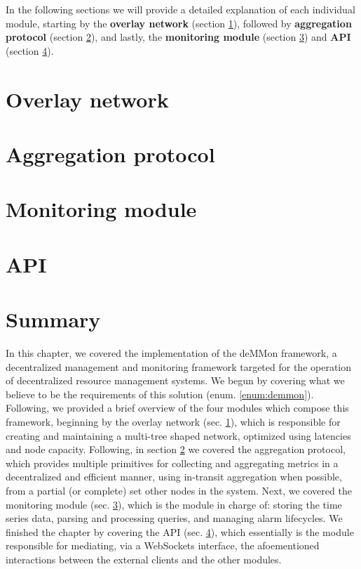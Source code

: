 In the following sections we will provide a detailed explanation of each individual module, starting by the \textbf{overlay network} (section \ref{sec:overlay_network}), followed by \textbf{aggregation protocol} (section \ref{sec:mon_protocol}), and lastly, the \textbf{monitoring module} (section \ref{sec:mon_module}) and \textbf{API} (section \ref{sec:api}). 

\section{Overlay network} 
\label{sec:overlay_network}


\section{Aggregation protocol}
\label{sec:mon_protocol}


\section{Monitoring module}
\label{sec:mon_module}


\section{API}
\label{sec:api}


\section{Summary}


In this chapter, we covered the implementation of the deMMon framework, a decentralized management and monitoring framework targeted for the operation of decentralized resource management systems. We begun by covering what we believe to be the requirements of this solution (enum. \ref{enum:demmon}). Following, we provided a brief overview of the four modules which compose this framework, beginning by the overlay network (sec. \ref{sec:overlay_network}), which is responsible for creating and maintaining a multi-tree shaped network, optimized using latencies and node capacity. Following, in section \ref{sec:mon_protocol} we covered the aggregation protocol, which provides multiple primitives for collecting and aggregating metrics in a decentralized and efficient manner, using in-transit aggregation when possible, from a partial (or complete) set other nodes in the system. Next, we covered the monitoring module (sec. \ref{sec:mon_module}), which is the module in charge of: storing the time series data, parsing and processing queries, and managing alarm lifecycles. We finished the chapter by covering the API (sec. \ref{sec:api}), which essentially is the module responsible for mediating, via a WebSockets interface, the afoementioned interactions between the external clients and the other modules.
